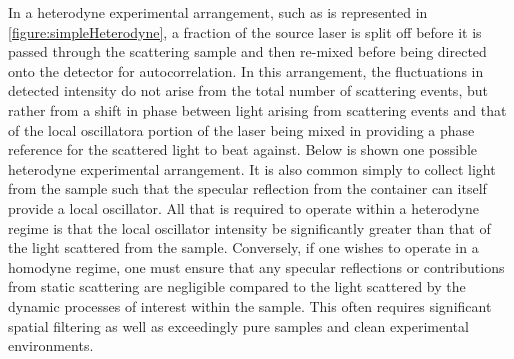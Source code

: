 In a heterodyne experimental arrangement, such as is represented in \fig \nolinebreak \ref{figure:simpleHeterodyne}, a fraction of the source laser is split off before it is passed through the scattering sample and then re-mixed before being directed onto the detector for autocorrelation. In this arrangement, the fluctuations in detected intensity do not arise from the total number of scattering events, but rather from a shift in phase between light arising from scattering events and that of the local oscillator\textemdash a portion of the laser being mixed in providing a phase reference for the scattered light to beat against.  Below is shown one possible heterodyne experimental arrangement.  It is also common simply to collect light from the sample such that the specular reflection from the container can itself provide a local oscillator.  All that is required to operate within a heterodyne regime is that the local oscillator intensity be significantly greater than that of the light scattered from the sample.   Conversely, if one wishes to operate in a homodyne regime, one must ensure that any specular reflections or contributions from static scattering are negligible compared to the light scattered by the dynamic processes of interest within the sample. This often requires significant spatial filtering as well as exceedingly pure samples and clean experimental environments.


